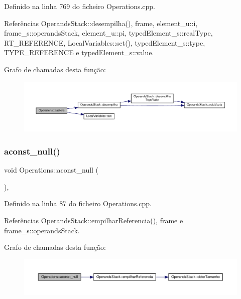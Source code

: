 Definido na linha 769 do ficheiro Operations.\+cpp.



Referências Operands\+Stack\+::desempilha(), frame, element\+\_\+u\+::i, frame\+\_\+s\+::operands\+Stack, element\+\_\+u\+::pi, typed\+Element\+\_\+s\+::real\+Type, R\+T\+\_\+\+R\+E\+F\+E\+R\+E\+N\+CE, Local\+Variables\+::set(), typed\+Element\+\_\+s\+::type, T\+Y\+P\+E\+\_\+\+R\+E\+F\+E\+R\+E\+N\+CE e typed\+Element\+\_\+s\+::value.

Grafo de chamadas desta função\+:\nopagebreak
\begin{figure}[H]
\begin{center}
\leavevmode
\includegraphics[width=350pt]{classOperations_a60b30bd84b2d59334e735f0adda6febe_cgraph}
\end{center}
\end{figure}
\mbox{\label{classOperations_af51ec8a98d9ed3167da0d8ac6279a1cd}} 
\subsubsection{\texorpdfstring{aconst\+\_\+null()}{aconst\_null()}}
{\footnotesize\ttfamily void Operations\+::aconst\+\_\+null (\begin{DoxyParamCaption}{ }\end{DoxyParamCaption})\hspace{0.3cm}{\ttfamily [static]}, {\ttfamily [private]}}



Definido na linha 87 do ficheiro Operations.\+cpp.



Referências Operands\+Stack\+::empilhar\+Referencia(), frame e frame\+\_\+s\+::operands\+Stack.

Grafo de chamadas desta função\+:\nopagebreak
\begin{figure}[H]
\begin{center}
\leavevmode
\includegraphics[width=350pt]{classOperations_af51ec8a98d9ed3167da0d8ac6279a1cd_cgraph}
\end{center}
\end{figure}
\mbox{\label{classOperations_a2f5c13146658e71de665c3b32ebed8c9}} 
